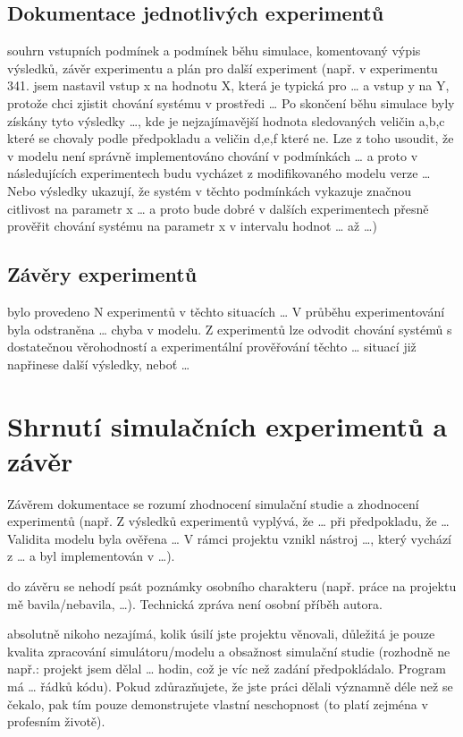 \documentclass{scrartcl}
\begin{document}
\subsection{Dokumentace jednotlivých experimentů}
\label{sec-5-2}
souhrn vstupních podmínek a podmínek běhu simulace, komentovaný výpis výsledků,
závěr experimentu a plán pro další experiment (např. v experimentu 341. jsem
nastavil vstup x na hodnotu X, která je typická pro \ldots{} a vstup y na Y, protože
chci zjistit chování systému v prostředi \ldots{} Po skončení běhu simulace byly
získány tyto výsledky \ldots{}, kde je nejzajímavější hodnota sledovaných veličin
a,b,c které se chovaly podle předpokladu a veličin d,e,f které ne. Lze z toho
usoudit, že v modelu není správně implementováno chování v podmínkách \ldots{} a
proto v následujících experimentech budu vycházet z modifikovaného modelu verze
\ldots{} Nebo výsledky ukazují, že systém v těchto podmínkách vykazuje značnou
citlivost na parametr x \ldots{} a proto bude dobré v dalších experimentech přesně
prověřit chování systému na parametr x v intervalu hodnot \ldots{} až \ldots{})

\subsection{Závěry experimentů}
\label{sec-5-3}
bylo provedeno N experimentů v těchto situacích \ldots{} V průběhu experimentování
byla odstraněna \ldots{} chyba v modelu. Z experimentů lze odvodit chování systémů s
dostatečnou věrohodností a experimentální prověřování těchto \ldots{} situací již
napřinese další výsledky, neboť \ldots{}

\section{Shrnutí simulačních experimentů a závěr}
\label{sec-6}
Závěrem dokumentace se rozumí zhodnocení simulační studie a zhodnocení
experimentů (např. Z výsledků experimentů vyplývá, že \ldots{} při předpokladu, že
\ldots{} Validita modelu byla ověřena \ldots{} V rámci projektu vznikl nástroj \ldots{}, který
vychází z \ldots{} a byl implementován v \ldots{}).

do závěru se nehodí psát poznámky osobního charakteru (např. práce na projektu
mě bavila/nebavila, \ldots{}). Technická zpráva není osobní příběh autora.

absolutně nikoho nezajímá, kolik úsilí jste projektu věnovali, důležitá je pouze
kvalita zpracování simulátoru/modelu a obsažnost simulační studie (rozhodně ne
např.: projekt jsem dělal \ldots{} hodin, což je víc než zadání
předpokládalo. Program má \ldots{} řádků kódu). Pokud zdůrazňujete, že jste práci
dělali významně déle než se čekalo, pak tím pouze demonstrujete vlastní
neschopnost (to platí zejména v profesním životě).
\end{document}
